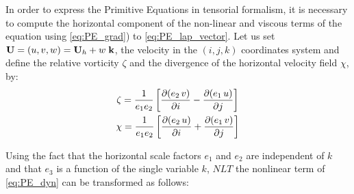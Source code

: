 \documentclass[../main/NEMO_manual]{subfiles}
\begin{document}
In order to express the Primitive Equations in tensorial formalism,
it is necessary to compute the horizontal component of the non-linear and viscous terms of the equation using
\autoref{eq:PE_grad}) to \autoref{eq:PE_lap_vector}.
Let us set $\mathbf{U} = (u,v,w) = \mathbf{U}_h + w \; \mathbf{k} $, the velocity in the $(i,j,k)$ coordinates system and
define the relative vorticity $\zeta$ and the divergence of the horizontal velocity field $\chi$, by:
\begin{gather}
  \label{eq:PE_curl_Uh}
  \zeta = \frac{1}{e_1 e_2} \lt[ \pd[(e_2 \, v)]{i} - \pd[(e_1 \, u)]{j} \rt] \\
  \label{eq:PE_div_Uh}
  \chi  = \frac{1}{e_1 e_2} \lt[ \pd[(e_2 \, u)]{i} + \pd[(e_1 \, v)]{j} \rt]
\end{gather}

Using the fact that the horizontal scale factors $e_1$ and $e_2$ are independent of $k$ and that
$e_3$  is a function of the single variable $k$,
$NLT$ the nonlinear term of \autoref{eq:PE_dyn} can be transformed as follows:
\end{document}
